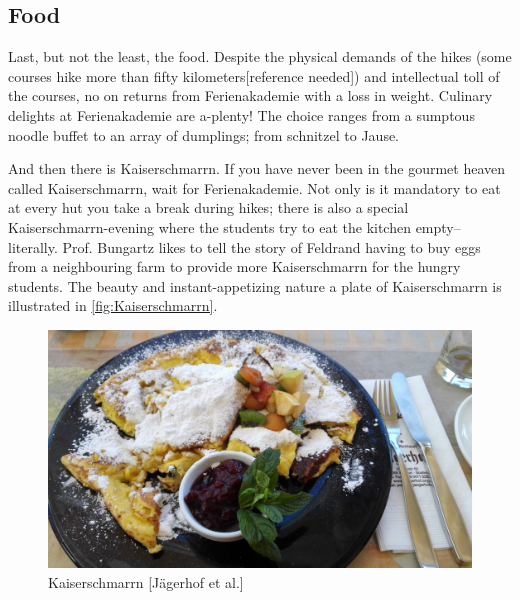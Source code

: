 \subsection{Food}
Last, but not the least, the food. Despite the physical demands of the hikes (some courses hike more than fifty kilometers[reference needed]) and intellectual toll of the courses, no on returns from Ferienakademie with a loss in weight. Culinary delights at Ferienakademie are a-plenty! The choice ranges from a sumptous noodle buffet to an array of dumplings; from schnitzel to Jause. 

And then there is Kaiserschmarrn. If you have never been in the gourmet heaven called Kaiserschmarrn, wait for Ferienakademie. Not only is it mandatory to eat at every hut you take a break during hikes; there is also a special Kaiserschmarrn-evening where the students try to eat the kitchen empty-- literally. Prof. Bungartz likes to tell the story of Feldrand having to buy eggs from a neighbouring farm to provide more Kaiserschmarrn for the hungry students. The beauty and instant-appetizing nature a plate of Kaiserschmarrn is illustrated in \autoref{fig:Kaiserschmarrn}.
\begin{figure}[ht]%
 	\begin{center}%
 		\includegraphics[scale=0.045]{img/Kaiserschmarrn.jpg}%
 		\caption{Kaiserschmarrn [Jägerhof et al.]}\label{fig:Kaiserschmarrn}%
 	\end{center}%
\end{figure}

